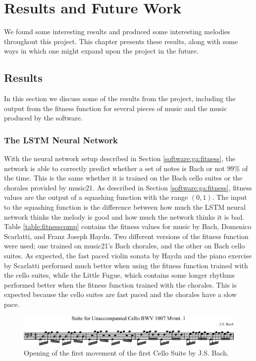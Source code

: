 \chapter{Results and Future Work} \label{results_future}

We found some interesting results and produced some interesting melodies throughout this project.
This chapter presents these results, along with some ways in which one might expand upon the project in the future.

\section{Results} \label{results}

In this section we discuss some of the results from the project, including the output from the fitness function for several pieces of music and the music produced by the software.

\subsection{The LSTM Neural Network}

With the neural network setup described in Section \ref{software:ga:fitness}, the network is able to correctly predict whether a set of notes is Bach or not $99\%$ of the time.
This is the same whether it is trained on the Bach cello suites or the chorales provided by music21.
As described in Section \ref{software:ga:fitness}, fitness values are the output of a squashing function with the range $(0,1)$.
The input to the squashing function is the difference between how much the LSTM neural network thinks the melody is good and how much the network thinks it is bad.
Table \ref{table:fitnesscomp} contains the fitness values for music by Bach, Domenico Scarlatti, and Franz Joseph Haydn.
Two different versions of the fitness function were used; one trained on music21's Bach chorales, and the other on Bach cello suites.
As expected, the fast paced violin sonata by Haydn and the piano exercise by Scarlatti performed much better when using the fitness function trained with the cello suites, while the Little Fugue, which contains some longer rhythms performed better when the fitness function trained with the chorales.
This is expected because the cello suites are fast paced and the chorales have a slow pace.

\begin{figure}[]
	\centering
	\includegraphics[width=\linewidth]{figures/cello_suite.pdf}
	\caption{Opening of the first movement of the first Cello Suite by J.S. Bach.}
	\label{fig:music:cello_suite}
\end{figure}

